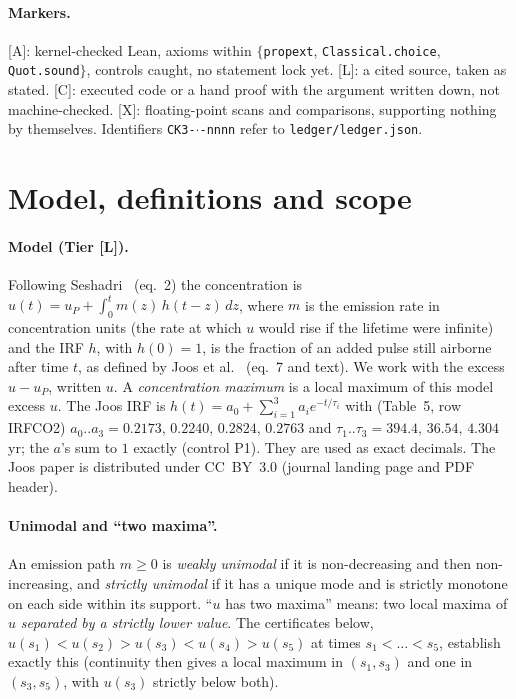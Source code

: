 \documentclass[10pt]{article}
\newcommand{\tier}[1]{\textsf{[#1]}}
\newcommand{\tA}{\tier{A}}
\newcommand{\tL}{\tier{L}}
\newcommand{\tC}{\tier{C}}
\newcommand{\tX}{\tier{X}}
\newcommand{\lean}[1]{\texttt{#1}}
\theoremstyle{plain}
\begin{document}
\medskip
\noindent{}

\paragraph{Markers.} \tA{}: kernel-checked Lean, axioms within $\{$\lean{propext}, \lean{Classical.choice}, \lean{Quot.sound}$\}$, controls caught, no statement lock yet. \tL{}: a cited source, taken as stated. \tC{}: executed code or a hand proof with the argument written down, not machine-checked. \tX{}: floating-point scans and comparisons, supporting nothing by themselves. Identifiers \texttt{CK3-$\cdot$-nnnn} refer to \texttt{ledger/ledger.json}.

\section{Model, definitions and scope}\label{sec:model}
\paragraph{Model (Tier \tL{}).} Following Seshadri~\cite{sesh} (eq.~2) the concentration is $u(t)=u_P+\int_0^t m(z)\,h(t-z)\,dz$, where $m$ is the emission rate in concentration units (the rate at which $u$ would rise if the lifetime were infinite) and the IRF $h$, with $h(0)=1$, is the fraction of an added pulse still airborne after time $t$, as defined by Joos et al.~\cite{joos} (eq.~7 and text). We work with the excess $u-u_P$, written $u$. A \emph{concentration maximum} is a local maximum of this model excess $u$.
The Joos IRF is $h(t)=a_0+\sum_{i=1}^{3}a_ie^{-t/\tau_i}$ with (Table~5, row IRFCO2) $a_0..a_3=0.2173,\,0.2240,\,0.2824,\,0.2763$ and $\tau_1..\tau_3=394.4,\,36.54,\,4.304$ yr; the $a$'s sum to $1$ exactly (control P1). They are used as exact decimals. The Joos paper is distributed under CC~BY~3.0 (journal landing page and PDF header).
\paragraph{Unimodal and ``two maxima''.} An emission path $m\ge0$ is \emph{weakly unimodal} if it is non-decreasing and then non-increasing, and \emph{strictly unimodal} if it has a unique mode and is strictly monotone on each side within its support. ``$u$ has two maxima'' means: two local maxima of $u$ \emph{separated by a strictly lower value}. The certificates below, $u(s_1)<u(s_2)>u(s_3)<u(s_4)>u(s_5)$ at times $s_1<\dots<s_5$, establish exactly this (continuity then gives a local maximum in $(s_1,s_3)$ and one in $(s_3,s_5)$, with $u(s_3)$ strictly below both).
\end{document}
